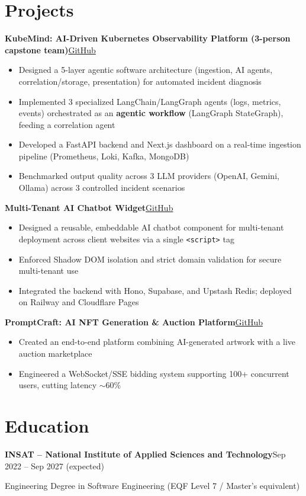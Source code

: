\documentclass[10pt,a4paper]{article}
\newcommand{\entry}[2]{\vspace{1pt}\noindent\textbf{#1}\hfill{\color{muted}#2}\par}
\newcommand{\gh}[1]{\href{https://github.com/Hsan003/#1}{GitHub}}
\begin{document}
\section{Projects}
\entry{KubeMind: AI-Driven Kubernetes Observability Platform (3-person capstone team)}{\gh{kubemind}}
\begin{itemize}
  \item Designed a 5-layer agentic software architecture (ingestion, AI agents, correlation/storage, presentation) for automated incident diagnosis
  \item Implemented 3 specialized LangChain/LangGraph agents (logs, metrics, events) orchestrated as an \textbf{agentic workflow} (LangGraph StateGraph), feeding a correlation agent
  \item Developed a FastAPI backend and Next.js dashboard on a real-time ingestion pipeline (Prometheus, Loki, Kafka, MongoDB)
  \item Benchmarked output quality across 3 LLM providers (OpenAI, Gemini, Ollama) across 3 controlled incident scenarios
\end{itemize}
\entry{Multi-Tenant AI Chatbot Widget}{\gh{AI-Assistant-Backend}}
\begin{itemize}
  \item Designed a reusable, embeddable AI chatbot component for multi-tenant deployment across client websites via a single \texttt{<script>} tag
  \item Enforced Shadow DOM isolation and strict domain validation for secure multi-tenant use
  \item Integrated the backend with Hono, Supabase, and Upstash Redis; deployed on Railway and Cloudflare Pages
\end{itemize}
\entry{PromptCraft: AI NFT Generation \& Auction Platform}{\gh{prompt-craft-back}}
\begin{itemize}
  \item Created an end-to-end platform combining AI-generated artwork with a live auction marketplace
  \item Engineered a WebSocket/SSE bidding system supporting 100+ concurrent users, cutting latency $\sim$60\%
\end{itemize}

\section{Education}
\entry{INSAT -- National Institute of Applied Sciences and Technology}{Sep 2022 -- Sep 2027 (expected)}
Engineering Degree in Software Engineering (EQF Level 7 / Master's equivalent)
\end{document}
